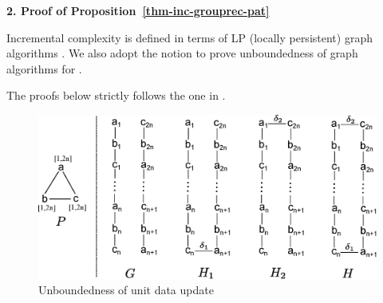 \noindent
{\textbf{2. Proof of Proposition~\ref{thm-inc-grouprec-pat}}}

Incremental complexity is defined in terms of LP (locally persistent) graph algorithms \cite{Reps96}.
We also adopt the notion to prove unboundedness of graph algorithms for \dynteamF.

\vspace{-1.5ex}
The proofs below strictly follows the one in \cite{Reps96}.

\vspace{-1.5ex}
\begin{figure}[ht!]
\label{fig-inc-complexity-data}
\begin{center}
\includegraphics[scale=0.31]{./fig/inc-complexity-proof-data.eps}
\end{center}
\vspace{-3ex}
\caption{Unboundedness of unit data update}
\vspace{-4ex}
\end{figure}

